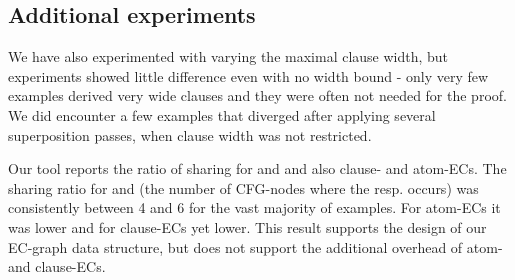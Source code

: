 \subsection*{Additional experiments}
We have also experimented with varying the maximal clause width, but experiments showed little difference even with no width bound - only very few examples derived very wide clauses and they were often not needed for the proof. We did encounter a few examples that diverged after applying several superposition passes, when clause width was not restricted.

Our tool reports the ratio of sharing for \GTs{} and \GFAs{} and also clause- and atom-ECs.
The sharing ratio for \GTs{} and \GFAs{} (the number of CFG-nodes where the \GT{} resp. \GFA{} occurs) was consistently between 4 and 6 for the vast majority of examples. For atom-ECs it was lower and for clause-ECs yet lower. This result supports the design of our EC-graph data structure, but does not support the additional overhead of atom- and clause-ECs.
